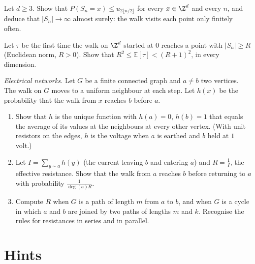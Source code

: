 \begin{exercise}[$\star\star$]\label{ex:escape}
Let $d\ge3$. Show that $P(S_n=x)\le u_{2\lfloor n/2\rfloor}$ for every $x\in\Z^d$ and every $n$, and deduce that $|S_n|\to\infty$ almost surely: the walk
visits each point only finitely often.
\end{exercise}

\begin{exercise}[$\star\star$]\label{ex:exittime}
Let $\tau$ be the first time the walk on $\Z^d$ started at $0$ reaches a point with $|S_n|\ge R$ (Euclidean norm, $R>0$). Show that
$R^2\le\mathbb E[\tau]<(R+1)^2$, in every dimension.
\end{exercise}

\begin{exercise}[$\star\star$]\label{ex:electric}
\emph{Electrical networks.} Let $G$ be a finite connected graph and $a\ne b$ two vertices. The walk on $G$ moves to a uniform
neighbour at each step. Let $h(x)$ be the probability that the walk from $x$ reaches $b$ before $a$.
\begin{enumerate}
\item[(a)] Show that $h$ is the unique function with $h(a)=0$, $h(b)=1$ that equals the average of its values at the
neighbours at every other vertex. (With unit resistors on the edges, $h$ is the voltage when $a$ is earthed and $b$ held
at $1$ volt.)
\item[(b)] Let $I=\sum_{y\sim a}h(y)$ (the current leaving $b$ and entering $a$) and $R=\frac1I$, the effective resistance. Show that the walk from $a$
reaches $b$ before returning to $a$ with probability $\frac1{\deg(a)R}$.
\item[(c)] Compute $R$ when $G$ is a path of length $m$ from $a$ to $b$, and when $G$ is a cycle in which $a$ and $b$ are joined by two
paths of lengths $m$ and $k$. Recognise the rules for resistances in series and in parallel.
\end{enumerate}
\end{exercise}

\section{Hints}

